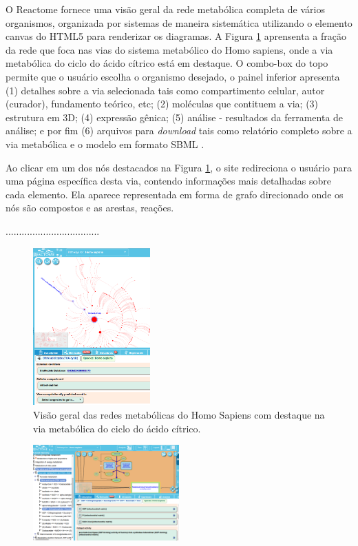 \documentclass[conference]{IEEEtran}
\begin{document}
\indent O Reactome fornece uma visão geral da rede metabólica completa de vários organismos, organizada por sistemas de maneira sistemática utilizando o elemento canvas do HTML5 para renderizar os diagramas. A Figura \ref{reactome_homo_small} aprensenta a fração da rede que foca nas vias do sistema metabólico do Homo sapiens, onde a via metabólica do ciclo do ácido cítrico está em destaque. O combo-box do topo permite que o usuário escolha o organismo desejado, o painel inferior apresenta (1) detalhes sobre a via selecionada tais como compartimento celular, autor (curador), fundamento teórico, etc; (2) moléculas que contituem a via; (3) estrutura em 3D; (4) expressão gênica; (5) análise - resultados da ferramenta de análise; e por fim (6) arquivos para \textit{download} tais como relatório completo sobre a via metabólica e o modelo em formato SBML \cite{reactomeArticle}.

\indent Ao clicar em um dos nós destacados na Figura \ref{reactome_homo_small}, o site redireciona o usuário para uma página específica desta via, contendo informações mais detalhadas sobre cada elemento. Ela aparece representada em forma de grafo direcionado onde os nós são compostos e as arestas, reações.

...................................
\begin{figure}[!t]
\centering
\includegraphics[width=0.4\textwidth]{reactome_homo_small.png}
\caption{Visão geral das redes metabólicas do Homo Sapiens com destaque na via metabólica do ciclo do ácido cítrico.}
\label{reactome_homo_small}
\end{figure}

\begin{figure}[!t]
\centering
\includegraphics[width=0.5\textwidth]{reactome_homo_acid.png}
\caption{}
\label{reactome_homo_acid}
\end{figure}
\end{document}
